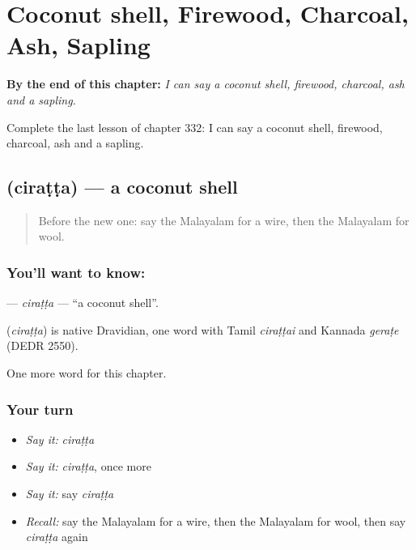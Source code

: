 
\chapter{Coconut shell, Firewood, Charcoal, Ash, Sapling}
\label{ch:ml-coconut-shell-firewood-charcoal-ash-sapling}

\begin{chapteropening}
\textbf{By the end of this chapter:} \emph{I can say a coconut shell, firewood, charcoal, ash and a sapling.}

Complete the last lesson of chapter 332: I can say a coconut shell, firewood, charcoal, ash and a sapling.
\end{chapteropening}

\section[\texorpdfstring{\ml{ചിരട്ട} (ciraṭṭa)}{ചിരട്ട (ciraṭṭa)}]{ (ciraṭṭa) — a coconut shell}

\label{lesson:ML-C332-ciratta}



\begin{quote}
Before the new one: say the Malayalam for a wire, then the Malayalam for wool.
\end{quote}

\subsection*{You'll want to know: }
\textbf{} — \emph{ciraṭṭa} — \textquotedblleft{}a coconut shell\textquotedblright{}.

\begin{cousinweb}
\textbf{} (\emph{ciraṭṭa}) is native Dravidian, one word with Tamil \emph{ciraṭṭai} and Kannada \emph{geraṭe} (DEDR 2550).
\end{cousinweb}

\begin{grammarlens}[title={What you've built}]
One more word for this chapter.
\end{grammarlens}

\subsection*{Your turn}
\begin{itemize}
\raggedright
  \item \emph{Say it:} \emph{ciraṭṭa}
  \item \emph{Say it:} \emph{ciraṭṭa}, once more
  \item \emph{Say it:} say \emph{ciraṭṭa}
  \item \emph{Recall:} say the Malayalam for a wire, then the Malayalam for wool, then say \emph{ciraṭṭa} again
\end{itemize}

